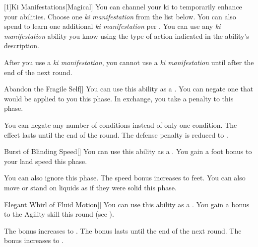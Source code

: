         [1]{Ki Manifestations}[Magical]
        You can channel your ki to temporarily enhance your abilities.
        Choose one \textit{ki manifestation} from the list below.
        You can also spend  to learn one additional \textit{ki manifestation} per .
        You can use any \textit{ki manifestation} ability you know using the type of action indicated in the ability's description.

        After you use a \textit{ki manifestation}, you cannot use a \textit{ki manifestation} until after the end of the next round.
        {
            \begin{freeability}{Abandon the Fragile Self}[]
                You can use this ability as a .
                You can negate one  that would be applied to you this phase.
                In exchange, you take a  penalty to  this phase.

                \rankline
                 You can negate any number of conditions instead of only one condition.
                 The effect lasts until the end of the round.
                 The defense penalty is reduced to .
            \end{freeability}

            \begin{freeability}{Burst of Blinding Speed}[]
                You can use this ability as a .
                You gain a  foot bonus to your land speed this phase.

                \rankline
                 You can also ignore  this phase.
                 The speed bonus increases to  feet.
                 You can also move or stand on liquids as if they were solid this phase.
            \end{freeability}

            \begin{freeability}{Elegant Whirl of Fluid Motion}[]
                You can use this ability as a .
                You gain a  bonus to the Agility skill this round (see ).

                \rankline
                 The bonus increases to .
                 The bonus lasts until the end of the next round.
                 The bonus increases to .
            \end{freeability}

}
